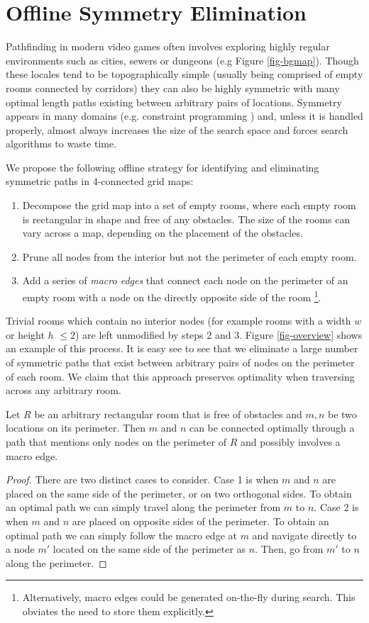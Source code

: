 \section{Offline Symmetry Elimination}
\label{algorithm}
Pathfinding in modern video games often involves exploring highly regular 
environments such as cities, sewers or dungeons (e.g Figure \ref{fig-bgmap}).
Though these locales tend to be topographically simple (usually being comprised
of empty rooms connected by corridors) they can also be highly symmetric 
with many optimal length paths existing between arbitrary pairs of locations.
Symmetry appears in many domains (e.g. constraint programming \cite{walsh07})
and, unless it is handled properly, almost always increases the size of the search space
and forces search algorithms to waste time.
\par
We propose the following offline strategy for identifying and eliminating symmetric paths in 
4-connected grid maps:
\begin{enumerate}
\item{Decompose the grid map into a set of empty rooms, where each empty room is 
rectangular in shape and free of any obstacles. 
The size of the rooms can vary across a map, depending
on the placement of the obstacles.}
\item{Prune all nodes from the interior but not the perimeter of each empty
room.}
\item{Add a series of \emph{macro edges} that connect each node on the perimeter of an empty room
with a node on the directly opposite side of the room 
\footnote{Alternatively, macro edges could be generated on-the-fly during search. 
This obviates the need to store them explicitly.}.}
\end{enumerate}
Trivial rooms which contain no interior nodes (for example rooms with a width $w$ or height $h$ 
$\leq 2$) are left unmodified by steps 2 and 3.
Figure \ref{fig-overview} shows an example of this process.
It is easy see to see that we eliminate a large number of symmetric paths
that exist between arbitrary pairs of nodes on the perimeter of each room.
We claim that this approach preserves optimality when traversing across any arbitrary room.

\begin{lemma}
\label{thm-roomtraversal}
Let $R$ be an arbitrary rectangular room that is free of obstacles
and $m, n$ be two locations on its perimeter.
Then $m$ and $n$ can be connected optimally through a path that
mentions only nodes on the perimeter of $R$ and possibly involves
a macro edge.
\end{lemma}
\begin{proof}
\par
There are two distinct cases to consider.
Case 1 is when $m$ and $n$ are placed on the same side of the perimeter, or
on two orthogonal sides. 
To obtain an optimal path we can simply travel along the perimeter from $m$ to $n$.
Case 2 is when $m$ and $n$ are placed on opposite sides of the perimeter.
To obtain an optimal path we can simply follow the macro edge at $m$ 
and navigate directly to a node $m'$ located on
the same side of the perimeter as $n$. Then, go from $m'$ to $n$ along the perimeter.
\end{proof}

